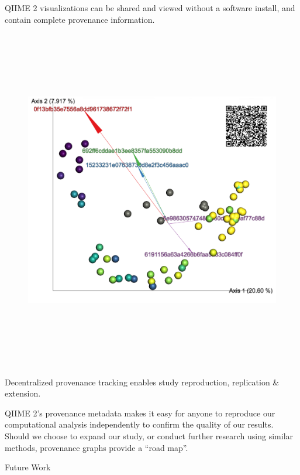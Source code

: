 \documentclass[final]{beamer}
\newlength{\colwidth}
\begin{document}
\begin{frame}[t]
\begin{columns}[t]
\begin{column}{\colwidth}
\begin{block}{QIIME 2 visualizations can be shared and viewed without a software install, and contain complete provenance information.}
    \begin{figure}[tph!]
      {\includegraphics[height=15cm]{assets/emperor}}
    \end{figure}

  \end{block}

  \begin{block}{Decentralized provenance tracking enables study reproduction, replication \& extension.}

    QIIME 2’s provenance metadata makes it easy for anyone to reproduce our
    computational analysis independently to confirm the quality of our results.
    Should we choose to expand our study, or conduct further research using
    similar methods, provenance graphs provide a “road map”.

  \end{block}

  \begin{block}{Future Work}


\end{block}
\end{column}
\end{columns}
\end{frame}
\end{document}
